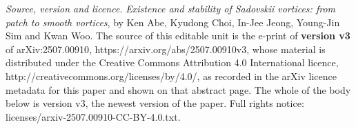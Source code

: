 \documentclass[10pt,a4paper]{amsart}
\theoremstyle{definition}
\theoremstyle{definition}
\numberwithin{equation}{section}
\newcommand{\0}{\emptyset}
\begin{document}
\maketitle
\noindent\emph{Source, version and licence.} \emph{Existence and stability of Sadovskii vortices: from patch to smooth vortices}, by Ken Abe, Kyudong Choi, In-Jee Jeong, Young-Jin Sim and Kwan Woo. The source of this editable unit is the e-print of \textbf{version v3} of arXiv:2507.00910, https://arxiv.org/abs/2507.00910v3, whose material is distributed under the Creative Commons Attribution 4.0 International licence, http://creativecommons.org/licenses/by/4.0/, as recorded in the arXiv licence metadata for this paper and shown on that abstract page. The whole of the body below is version v3, the newest version of the paper. Full rights notice: licenses/arxiv-2507.00910-CC-BY-4.0.txt.\par\smallskip
\end{document}
